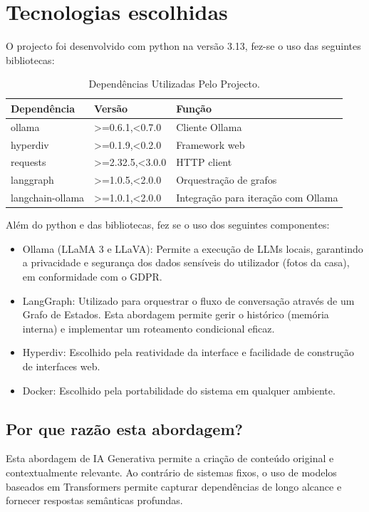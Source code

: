 \documentclass[a4paper,12pt]{scrreprt}
\begin{document}
    \section{Tecnologias escolhidas}
        O projecto foi desenvolvido com python na versão 3.13, fez-se o uso das seguintes bibliotecas:
        \begin{table}[!h]
            \centering
            \begin{tabular}{|p{3.4cm}|p{4cm}|p{5cm}|}
               \hline
               \rowcolor{gray!20!white}
                Dependência & Versão & Função \\
                \hline
                ollama & >=0.6.1,<0.7.0 & Cliente Ollama \\
                \hline
                hyperdiv & >=0.1.9,<0.2.0 & Framework web \\
                \hline
                requests & >=2.32.5,<3.0.0 & HTTP client \\
                \hline
                langgraph & >=1.0.5,<2.0.0 & Orquestração de grafos \\
                \hline
                langchain-ollama & >=1.0.1,<2.0.0 & Integração para iteração com Ollama \\
                \hline
            \end{tabular}
            \caption{Dependências Utilizadas Pelo Projecto.}
        \end{table}

        Além do python e das bibliotecas, fez se o uso dos seguintes componentes:
        \begin{itemize}
            \item Ollama (LLaMA 3 e LLaVA): Permite a execução de LLMs locais, garantindo a privacidade e segurança dos dados sensíveis do utilizador (fotos da casa), em conformidade com o GDPR.
            \item LangGraph: Utilizado para orquestrar o fluxo de conversação através de um Grafo de Estados. Esta abordagem permite gerir o histórico (memória interna) e implementar um roteamento condicional eficaz.
            \item Hyperdiv: Escolhido pela reatividade da interface e facilidade de construção de interfaces web.
            \item Docker: Escolhido pela portabilidade do sistema em qualquer ambiente.
        \end{itemize}

    \subsection{Por que razão esta abordagem?}
        Esta abordagem de IA Generativa permite a criação de conteúdo original e contextualmente relevante. Ao contrário de sistemas fixos, o uso de modelos baseados em Transformers permite capturar dependências de longo alcance e fornecer respostas semânticas profundas.
\end{document}
